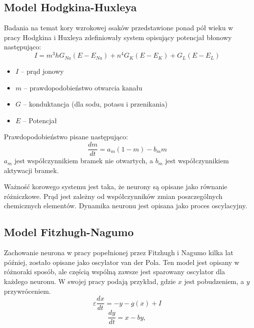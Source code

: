 \subsection{Model Hodgkina-Huxleya}
Badania na temat kory wzrokowej ssaków przedstawione ponad pół wieku w pracy Hodgkina i Huxleya
zdefiniowały system opisujący potencjał błonowy następująco:
$$I=m^3 hG_{Na} (E-E_{Na}) + n^4G_K(E-E_K)+G_L(E-E_L) $$
\begin{itemize}
\item $I$ -- prąd jonowy
\item $m$ -- prawdopodobieństwo otwarcia kanału
\item $G$ -- konduktancja (dla sodu, potasu i przenikania)
\item $E$ -- Potencjał
\end{itemize}
Prawdopodobieństwo pisane następująco:
$$\frac{dm}{dt}=a_m(1-m)-b_mm$$
$a_m$ jest współczynnikiem bramek nie otwartych, a $b_m$ jest współczynnikiem aktywacji bramek.

Ważność korowego systemu jest taka, że neurony są opisane jako równanie różniczkowe.
Prąd jest zależny od współczynników zmian poszczególnych chemicznych elementów.
Dynamika neuronu jest opisana jako proces oscylacyjny.
\subsection{Model Fitzhugh-Nagumo}
Zachowanie neurona w pracy popełnionej przez Fitzhugh i Nagumo kilka lat później, 
zostało opisane jako oscylator van der Pola.
Ten model jest opisany w różnoraki sposób, ale częścią wspólną zawsze jest sparowany oscylator dla każdego neuronu.
W swojej pracy podają przykład, gdzie $x$ jest pobudzeniem, a $y$ przywróceniem. 
$$\varepsilon\frac{dx}{dt}=-y-g(x)+I$$
$$\frac{dy}{dt}=x-by,$$

